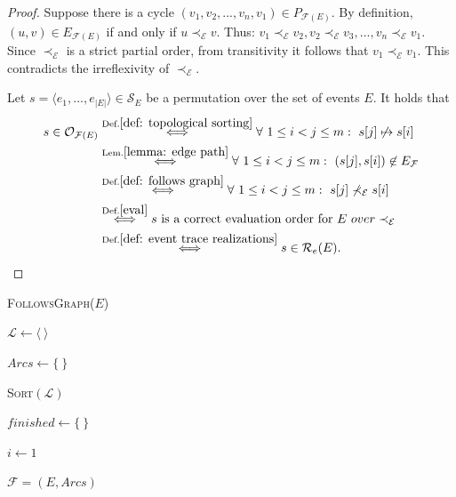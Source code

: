 \begin{proof}
Suppose there is a cycle $(v_1,v_2,...,v_n,v_1) \in P_{\mathcal{F}(E)}$.
By definition, $(u,v)\in E_{\mathcal{F}(E)}$ if and only if $u \prec_{\mathcal{E}} v$.
Thus: $v_1 \prec_{\mathcal{E}} v_2, v_2 \prec_{\mathcal{E}} v_3, ..., v_n \prec_{\mathcal{E}} v_1$.
Since $\prec_{\mathcal{E}}$ is a strict partial order, from transitivity it follows that $v_1 \prec_{\mathcal{E}} v_1$.
This contradicts the irreflexivity of $\prec_{\mathcal{E}}.$

Let $s = \langle e_1,...,e_{|E|} \rangle \in \mathcal{S}_E$ be a permutation over the set of events $E$.
It holds that 
\begin{align*}
s \in \mathcal{O}_{\mathcal{F}(E)} 
&\overset{\text{Def.} \ref{def: topological sorting}}{\Longleftrightarrow} 
\forall ~ 1 \leq i < j \leq m: ~ s[j] \not \mapsto s[i] \\ 
&\overset{\text{Lem.} \ref{lemma: edge path}}{\Longleftrightarrow} 
\forall ~ 1 \leq i < j \leq m: ~
(s[j],s[i]) \not \in E_{\mathcal{F}} \\
&\overset{\text{Def.} \ref{def: follows graph}}{\Longleftrightarrow} 
\forall ~ 1 \leq i < j \leq m: ~
s[j] \not \prec_{\mathcal{E}} s[i] \\
&\overset{\text{Def.} \ref{eval}}{\Longleftrightarrow} 
 s \text{ is a correct evaluation order for } E~ over \prec_{\mathcal{E}} \\
&\overset{\text{Def.} \ref{def: event trace realizations}}{\Longleftrightarrow} 
s \in \mathcal{R}_e(E).
\end{align*} 
\end{proof}


\begin{algorithm}[h!]
	\caption{\textsc{FollowsGraph($E$)}}
	\label{alg:follows graph}
	
	$\mathcal{L} \gets \langle ~ \rangle$ 
	
	$Arcs \gets \{~\}$ 
	
	 \label{1: 5}
	
	\textsc{Sort}$(\mathcal{L})$  \label{1: 6}
	
	$finished \gets \{ ~ \}$ 
	
	$i \gets 1$
	
	
	\Return $\mathcal{F}=(E,Arcs)$
\end{algorithm}
\pagebreak

